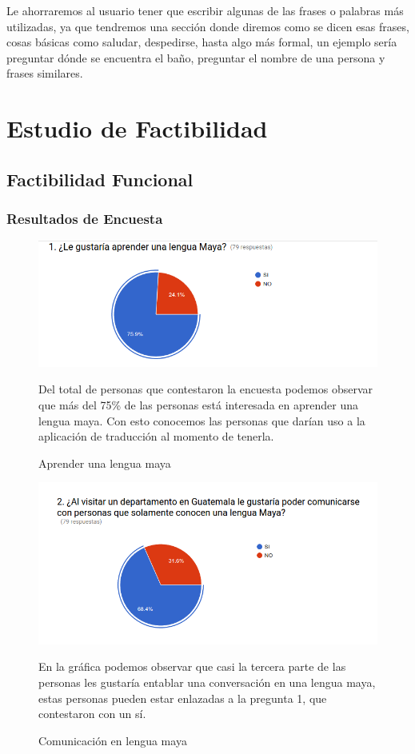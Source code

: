 \documentclass[a4paper,openright,11pt]{article}
\begin{document}
Le ahorraremos al usuario tener que escribir algunas de las frases o palabras m\'as utilizadas, ya que tendremos una secci\'on donde diremos como se dicen esas frases, cosas b\'asicas como saludar, despedirse, hasta algo m\'as formal, un ejemplo ser\'ia preguntar d\'onde se encuentra el baño, preguntar el nombre de una persona y frases similares.\\
\newpage

\section{Estudio de Factibilidad}
\subsection{Factibilidad Funcional}
\subsubsection{Resultados de Encuesta}
\begin{figure}[H]
	\includegraphics[width=1.0\textwidth]{e1}
	\caption{Aprender una lengua maya}
	\label{fig:e1}
	Del total de personas que contestaron la encuesta podemos observar que más del 75\% de las personas está interesada en aprender una lengua maya. Con esto conocemos las personas que darían uso a la aplicación de traducción al momento de tenerla.
\end{figure}
\begin{figure}[H]
	\includegraphics[width=1.0\textwidth]{e2}
	\caption{Comunicación en lengua maya}
	\label{fig:e2}
	En la gráfica podemos observar que casi la tercera parte de las personas les gustaría entablar una conversación en una lengua maya, estas personas pueden estar enlazadas a la pregunta 1, que contestaron con un sí.
\end{figure}
\end{document}
